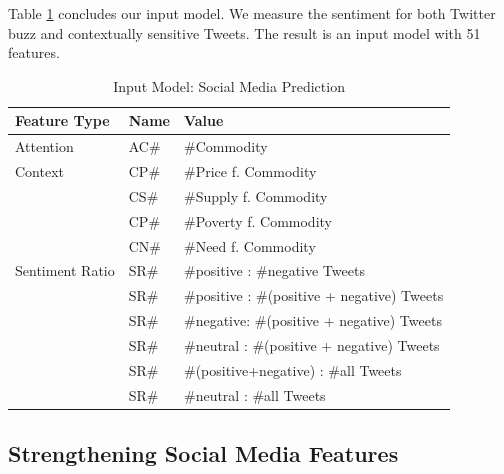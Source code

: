 Table \ref{tab:socio_feat} concludes our input model. We measure the sentiment for both Twitter buzz and contextually sensitive Tweets. The result is an input model with 51 features. 
 

\begin{table}[H]
\centering
\begin{tabular}{ |p{3cm}|p{3cm}|p{8cm}| }



 Feature Type & Name & Value    \\
\hline
Attention & AC\# & \#Commodity   \\
\hline
Context & CP\# & \#Price f. Commodity   \\
        & CS\# & \#Supply f. Commodity  \\
        &CP\# & \#Poverty f. Commodity   \\
        &CN\# &\#Need f. Commodity  \\



  \hline
   Sentiment Ratio & SR\#& \#positive : \#negative Tweets  \\
                      & SR\# & \#positive : \#(positive + negative) Tweets   \\
                 & SR\#  & \#negative: \#(positive + negative) Tweets  \\
               &SR\#   & \#neutral : \#(positive + negative) Tweets  \\
                &SR\#  & \#(positive+negative) : \#all Tweets   \\                 
                &SR\#  & \#neutral : \#all Tweets \\
                          

   


\end{tabular}
\caption{Input Model: Social Media Prediction}
\label{tab:socio_feat}
\end{table}





\subsection{Strengthening Social Media Features\\}

